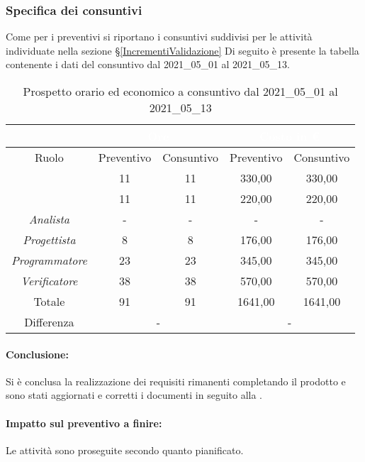 \subsubsection{Specifica dei consuntivi}
Come per i preventivi si riportano i consuntivi suddivisi per le attività individuate nella sezione \S\ref{IncrementiValidazione}
Di seguito è presente la tabella contenente i dati del consuntivo dal 2021\_05\_01 al 2021\_05\_13.
\begin{table}[H]
	\centering
	\begin{tabular}{|c|c|c|c|c|}
		\rowcolor{darkblue} 
		&\multicolumn{2}{c|}{\textcolor{white}{Ore}}&\multicolumn{2}{c|}{\textcolor{white}{Costo in €}}\\ \hline
		Ruolo				&	Preventivo			&	Consuntivo		&	Preventivo	&	Consuntivo\\ \hline
		{\Responsabile}		&	11					&	11				&	330,00		&	330,00 \\ \hline
		{\Amministratore}	&	11					&	11				&	220,00		&	220,00 \\ \hline
		\textit{Analista}	&	-					&	-				&	-			&	- \\ \hline
		\textit{Progettista}& 	8					&   8 				& 	176,00		&  	176,00 \\ \hline
		\textit{Programmatore}& 23					& 	23				& 	345,00		&  	345,00 \\ \hline
		\textit{Verificatore}&	38					&	38				&	570,00		&	570,00\\ \hline
		Totale				&	91					&	91				&	1641,00		&	1641,00 \\ \hline
		Differenza			& 	\multicolumn{2}{c|}{-} 			    &\multicolumn{2}{c|}{-}\\ \hline
	\end{tabular}
	\caption{Prospetto orario ed economico a consuntivo dal 2021\_05\_01 al 2021\_05\_13}
\end{table}
\paragraph*{Conclusione:}
Si è conclusa la realizzazione dei requisiti rimanenti completando il prodotto e sono stati aggiornati e corretti i documenti in seguito alla .
\paragraph*{Impatto sul preventivo a finire:}
Le attività sono proseguite secondo quanto pianificato.

